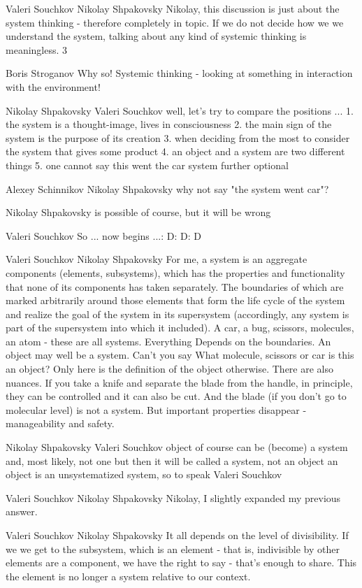 \documentclass[11pt,a4paper]{article}
\begin{document}
Valeri Souchkov Nikolay Shpakovsky Nikolay, this discussion is just about the
system thinking - therefore completely in topic. If we do not decide how we we
understand the system, talking about any kind of systemic thinking is
meaningless. 3

Boris Stroganov Why so! Systemic thinking - looking at something in
interaction with the environment!

Nikolay Shpakovsky Valeri Souchkov well, let's try to compare the positions
...  1. the system is a thought-image, lives in consciousness 2. the main sign
of the system is the purpose of its creation 3. when deciding from the most to
consider the system that gives some product 4. an object and a system are two
different things 5. one cannot say this went the car system further optional

Alexey Schinnikov Nikolay Shpakovsky why not say "the system went car"?

Nikolay Shpakovsky is possible of course, but it will be wrong

Valeri Souchkov So ... now begins ...: D: D: D

Valeri Souchkov Nikolay Shpakovsky For me, a system is an aggregate components
(elements, subsystems), which has the properties and functionality that none
of its components has taken separately. The boundaries of which are marked
arbitrarily around those elements that form the life cycle of the system and
realize the goal of the system in its supersystem (accordingly, any system is
part of the supersystem into which it included). A car, a bug, scissors,
molecules, an atom - these are all systems. Everything Depends on the
boundaries. An object may well be a system. Can't you say What molecule,
scissors or car is this an object? Only here is the definition of the object
otherwise. There are also nuances. If you take a knife and separate the blade
from the handle, in principle, they can be controlled and it can also be
cut. And the blade (if you don’t go to molecular level) is not a system. But
important properties disappear - manageability and safety.

Nikolay Shpakovsky Valeri Souchkov object of course can be (become) a system
and, most likely, not one but then it will be called a system, not an object
an object is an unsystematized system, so to speak Valeri Souchkov

Valeri Souchkov Nikolay Shpakovsky Nikolay, I slightly expanded my previous
answer.

Valeri Souchkov Nikolay Shpakovsky It all depends on the level of
divisibility. If we we get to the subsystem, which is an element - that is,
indivisible by other elements are a component, we have the right to say -
that's enough to share. This the element is no longer a system relative to our
context.
\end{document}
